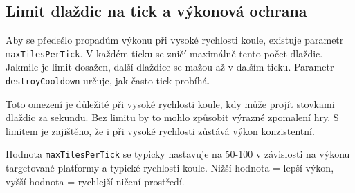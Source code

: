 \subsection{Limit dlaždic na tick a výkonová ochrana}

Aby se předešlo propadům výkonu při vysoké rychlosti koule, existuje parametr \texttt{maxTilesPerTick}. V každém ticku se zničí maximálně tento počet dlaždic. Jakmile je limit dosažen, další dlaždice se mažou až v dalším ticku. Parametr \texttt{destroyCooldown} určuje, jak často tick probíhá.

Toto omezení je důležité při vysoké rychlosti koule, kdy může projít stovkami dlaždic za sekundu. Bez limitu by to mohlo způsobit výrazné zpomalení hry. S limitem je zajištěno, že i při vysoké rychlosti zůstává výkon konzistentní.

Hodnota \texttt{maxTilesPerTick} se typicky nastavuje na 50-100 v závislosti na výkonu targetované platformy a typické rychlosti koule. Nižší hodnota = lepší výkon, vyšší hodnota = rychlejší ničení prostředí.